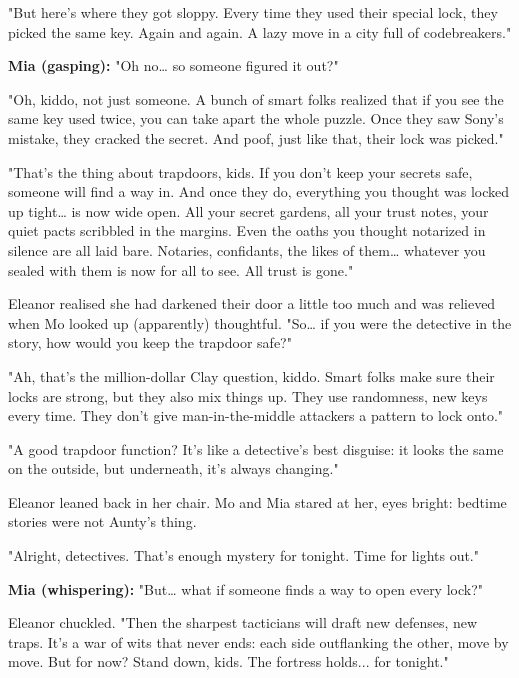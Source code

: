 "But here’s where they got sloppy. Every time they used their special lock, they picked the same key. Again and again. A lazy move in a city full of codebreakers."

\smallskip

\textbf{Mia (gasping):} "Oh no… so someone figured it out?"

"Oh, kiddo, not just someone. A bunch of smart folks realized that if you see the same key used twice, you can take apart the whole puzzle. Once they saw Sony’s mistake, they cracked the secret. And poof, just like that, their lock was picked."

"That’s the thing about trapdoors, kids. If you don’t keep your secrets safe, someone will find a way in. And once they do, everything you thought was locked up tight… is now wide open. All your secret gardens, all your trust notes, your quiet pacts scribbled in the margins. Even the oaths you thought notarized in silence are all laid bare. Notaries, confidants, the likes of them… whatever you sealed with them is now for all to see. All trust is gone."

\smallskip
Eleanor realised she had darkened their door a little too much and was relieved when Mo looked up (apparently) thoughtful. "So… if you were the detective in the story, how would you keep the trapdoor safe?"

"Ah, that’s the million-dollar Clay question, kiddo. Smart folks make sure their locks are strong, but they also mix things up. They use randomness, new keys every time. They don’t give man-in-the-middle attackers a pattern to lock onto."

"A good trapdoor function? It’s like a detective’s best disguise: it looks the same on the outside, but underneath, it’s always changing."

Eleanor leaned back in her chair. Mo and Mia stared at her, eyes bright: bedtime stories were not Aunty's thing.

"Alright, detectives. That’s enough mystery for tonight. Time for lights out."

\smallskip

\textbf{Mia (whispering):} "But… what if someone finds a way to open every lock?"

Eleanor chuckled. "Then the sharpest tacticians will draft new defenses, new traps. It’s a war of wits that never ends: each side outflanking the other, move by move. But for now? Stand down, kids. The fortress holds... for tonight."

